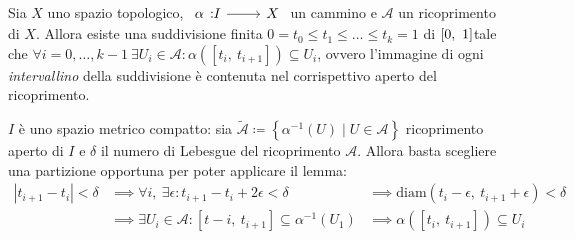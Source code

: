 \begin{corollary} \label{corollario suddivisione}
	Sia $X$ uno spazio topologico, $\funz \alpha I X$ un cammino e $\mathcal{A}$ un ricoprimento di $X$. Allora esiste una suddivisione finita $0=t_0\leq t_1\leq \dots\leq t_k=1$ di $\left[0,\ 1\right]$tale che $\forall i=0,\dots,k-1 \ \exists U_i\in\mathcal{A} \colon \alpha([t_i,\ t_{i+1}])\subseteq U_i$, ovvero l'immagine di ogni \textit{intervallino} della suddivisione è contenuta nel corrispettivo aperto del ricoprimento.
\end{corollary}
\begin{demonstration}
	$I$ è uno spazio metrico compatto: sia $\widetilde{\mathcal{A}}\coloneqq \left\{ \alpha^{-1}(U)\mid U\in\mathcal{A}\right\}$ ricoprimento aperto di $I$ e $\delta$ il numero di Lebesgue del ricoprimento $\mathcal{A}$. Allora basta scegliere una partizione opportuna per poter applicare il lemma:
		\begin{equation*}
			\begin{array}{lll}
				|t_{i+1} - t_i|<\delta& \implies \forall i, \ \exists\epsilon \colon t_{i+1}-t_i+2\epsilon <\delta &\implies \text{diam}(t_i -\epsilon,\ t_{i+1}+\epsilon)<\delta\\
				&\implies \exists U_i\in\mathcal{A}\colon [t-i,\ t_{i+1}]\subseteq \alpha^{-1}(U_1) &\implies \alpha([t_i,\ t_{i+1}])\subseteq U_i
			\end{array}
		\end{equation*}
\end{demonstration}
